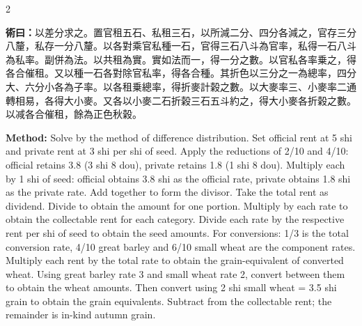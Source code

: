 \documentclass[11pt,a4paper]{article}
\newcommand{\MethodText}[1]{\par\noindent\textbf{\color{methodcolor}術曰：}#1\par}
\newcommand{\MethodEn}[1]{\par\noindent\textbf{\color{methodcolor}Method:} #1\par}
\begin{document}
\begin{paracol}{2}
\MethodText{以差分求之。置官租五石、私租三石，以所減二分、四分各減之，官存三分八釐，私存一分八釐。以各對乘官私種一石，官得三石八斗為官率，私得一石八斗為私率。副併為法。以共租為實。實如法而一，得一分之數。以官私各率乗之，得各合催租。又以種一石各對除官私率，得各合種。其折色以三分之一為總率，四分大、六分小各為子率。以各租乗總率，得折麥計榖之數。以大麥率三、小麥率二通轉相易，各得大小麥。又各以小麥二石折榖三石五斗約之，得大小麥各折榖之數。以减各合催租，餘為正色秋榖。}
\switchcolumn
\MethodEn{Solve by the method of difference distribution. Set official rent at 5 shi and private rent at 3 shi per shi of seed. Apply the reductions of 2/10 and 4/10: official retains 3.8 (3 shi 8 dou), private retains 1.8 (1 shi 8 dou). Multiply each by 1 shi of seed: official obtains 3.8 shi as the official rate, private obtains 1.8 shi as the private rate. Add together to form the divisor. Take the total rent as dividend. Divide to obtain the amount for one portion. Multiply by each rate to obtain the collectable rent for each category. Divide each rate by the respective rent per shi of seed to obtain the seed amounts. For conversions: 1/3 is the total conversion rate, 4/10 great barley and 6/10 small wheat are the component rates. Multiply each rent by the total rate to obtain the grain-equivalent of converted wheat. Using great barley rate 3 and small wheat rate 2, convert between them to obtain the wheat amounts. Then convert using 2 shi small wheat = 3.5 shi grain to obtain the grain equivalents. Subtract from the collectable rent; the remainder is in-kind autumn grain.}

\end{paracol}
\end{document}
